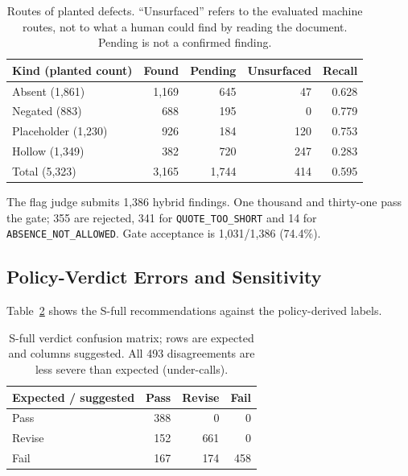 \documentclass[computers,article,submit,moreauthors]{Definitions/mdpi}
\begin{document}
\begin{table}[!ht]
\caption{Routes of planted defects. ``Unsurfaced'' refers to the evaluated machine routes, not to what a human could find by reading the document. Pending is not a confirmed finding.}
\label{tab:kinds}
\centering\footnotesize
\begin{tabular}{@{}lrrrr@{}}
\toprule
Kind (planted count) & Found & Pending & Unsurfaced & Recall \\
\midrule
Absent (1,861) & 1,169 & 645 & 47 & 0.628 \\
Negated (883) & 688 & 195 & 0 & 0.779 \\
Placeholder (1,230) & 926 & 184 & 120 & 0.753 \\
Hollow (1,349) & 382 & 720 & 247 & 0.283 \\
\midrule
Total (5,323) & 3,165 & 1,744 & 414 & 0.595 \\
\bottomrule
\end{tabular}
\end{table}

The flag judge submits 1,386 hybrid findings. One thousand and thirty-one pass the gate; 355 are rejected, 341 for \texttt{QUOTE\_TOO\_SHORT} and 14 for \texttt{ABSENCE\_NOT\_ALLOWED}. Gate acceptance is 1,031/1,386 (74.4\%). 

\subsection{Policy-Verdict Errors and Sensitivity}\label{sec:threshold}

Table~\ref{tab:confusion} shows the S-full recommendations against the policy-derived labels.

\begin{table}[!ht]
\caption{S-full verdict confusion matrix; rows are expected and columns suggested. All 493 disagreements are less severe than expected (under-calls).}
\label{tab:confusion}
\centering\small
\begin{tabular}{@{}lrrr@{}}
\toprule
Expected / suggested & Pass & Revise & Fail \\
\midrule
Pass & 388 & 0 & 0 \\
Revise & 152 & 661 & 0 \\
Fail & 167 & 174 & 458 \\
\bottomrule
\end{tabular}
\end{table}
\end{document}
